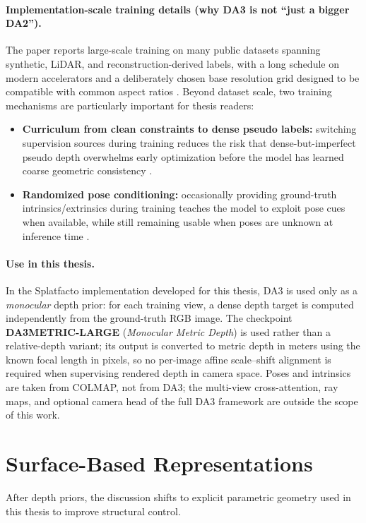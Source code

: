 \documentclass{report}
\begin{document}
\paragraph{Implementation-scale training details (why DA3 is not ``just a bigger DA2'').}
The paper reports large-scale training on many public datasets spanning synthetic, LiDAR, and reconstruction-derived labels, with a long schedule on modern accelerators and a deliberately chosen base resolution grid designed to be compatible with common aspect ratios \cite{lin2025depthanything3}. Beyond dataset scale, two training mechanisms are particularly important for thesis readers:
\begin{itemize}
    \item \textbf{Curriculum from clean constraints to dense pseudo labels:} switching supervision sources during training reduces the risk that dense-but-imperfect pseudo depth overwhelms early optimization before the model has learned coarse geometric consistency \cite{lin2025depthanything3}.
    \item \textbf{Randomized pose conditioning:} occasionally providing ground-truth intrinsics/extrinsics during training teaches the model to exploit pose cues when available, while still remaining usable when poses are unknown at inference time \cite{lin2025depthanything3}.
\end{itemize}



\paragraph{Use in this thesis.}
In the Splatfacto implementation developed for this thesis, DA3 is used only as a \emph{monocular} depth prior: for each training view, a dense depth target is computed independently from the ground-truth RGB image. The checkpoint \textbf{DA3METRIC-LARGE} (\emph{Monocular Metric Depth}) is used rather than a relative-depth variant; its output is converted to metric depth in meters using the known focal length in pixels, so no per-image affine scale--shift alignment is required when supervising rendered depth in camera space. Poses and intrinsics are taken from COLMAP, not from DA3; the multi-view cross-attention, ray maps, and optional camera head of the full DA3 framework are outside the scope of this work.



\section{Surface-Based Representations}
After depth priors, the discussion shifts to explicit parametric geometry used in this thesis to improve structural control.
\end{document}
